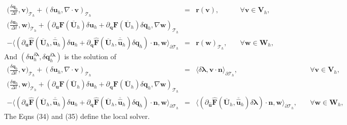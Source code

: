 \documentclass[11pt]{article}
\begin{document}
\begin{equation}
\begin{array}{rcll}
\displaystyle \Big(\frac{\delta \bm{q}_h}{\Delta t}, \bm{v} \Big)_{\mathcal{T}_h} + (\delta \bm{u}_h, \nabla \cdot \bm{v})_{\mathcal{T}_h}  & = & \bm{r}(\bm{v}), & \quad \forall \bm{v} \in \bm{V}_h, \\[2ex] 
\displaystyle \Big(\frac{\delta \bm{u}_h}{\Delta t}, \bm{w} \Big)_{\mathcal{T}_h} + (\partial_{\bm{u}} \bm{F} (\overline{\bm{U}}_h) \delta \bm{u}_h + \partial_{\bm{q}} \bm{F} (\overline{\bm{U}}_h) \delta \bm{q}_h, \nabla \bm{w})_{\mathcal{T}_h} & & \\[2ex]
- \langle (\partial_{\bm{u}} \widehat{\bm{F}} (\overline{\bm{U}}_h, \overline{\widehat{\bm{u}}}_h) \delta \bm{u}_h + \partial_{{\bm{q}}} \widehat{\bm{F}} (\overline{\bm{U}}_h, \overline{\widehat{\bm{u}}}_h) \delta {\bm{q}}_h) \cdot \bm{n}, \bm{w} \rangle_{\partial \mathcal{T}_h}  & = &  \bm{r}(\bm{w})_{\mathcal{T}_h},  & \quad \forall \bm{w} \in \bm{W}_h,
\end{array}
\end{equation}
And $(\delta \bm{u}_h^{\delta \bm{\lambda}},\delta \bm{q}_h^{\delta \bm{\lambda}})$ is the solution of
\begin{equation}
\begin{array}{rcll}
\displaystyle \Big(\frac{\delta \bm{q}_h}{\Delta t}, \bm{v} \Big)_{\mathcal{T}_h} + (\delta \bm{u}_h, \nabla \cdot \bm{v})_{\mathcal{T}_h}   & = & \langle \delta {\bm{\lambda}}, \bm{v} \cdot \bm{n} \rangle_{\partial \mathcal{T}_h} , & \quad \forall \bm{v} \in \bm{V}_h, \\[2ex] 
\displaystyle \Big(\frac{\delta \bm{u}_h}{\Delta t}, \bm{w} \Big)_{\mathcal{T}_h} + (\partial_{\bm{u}} \bm{F} (\overline{\bm{U}}_h) \delta \bm{u}_h + \partial_{\bm{q}} \bm{F} (\overline{\bm{U}}_h) \delta \bm{q}_h, \nabla \bm{w})_{\mathcal{T}_h} & & \\[2ex]
- \langle (\partial_{\bm{u}} \widehat{\bm{F}} (\overline{\bm{U}}_h, \overline{\widehat{\bm{u}}}_h) \delta \bm{u}_h + \partial_{{\bm{q}}} \widehat{\bm{F}} (\overline{\bm{U}}_h, \overline{\widehat{\bm{u}}}_h) \delta {\bm{q}}_h) \cdot \bm{n}, \bm{w} \rangle_{\partial \mathcal{T}_h}  & = &  \langle (\partial_{\widehat{\bm{u}}} \widehat{\bm{F}} (\overline{\bm{U}}_h, \overline{\widehat{\bm{u}}}_h) \delta {\bm{\lambda}}) \cdot \bm{n}, \bm{w} \rangle_{\partial \mathcal{T}_h},  & \quad \forall \bm{w} \in \bm{W}_h,
\end{array}
\end{equation}
The Eqns (34) and (35) define the local solver.
\end{document}
